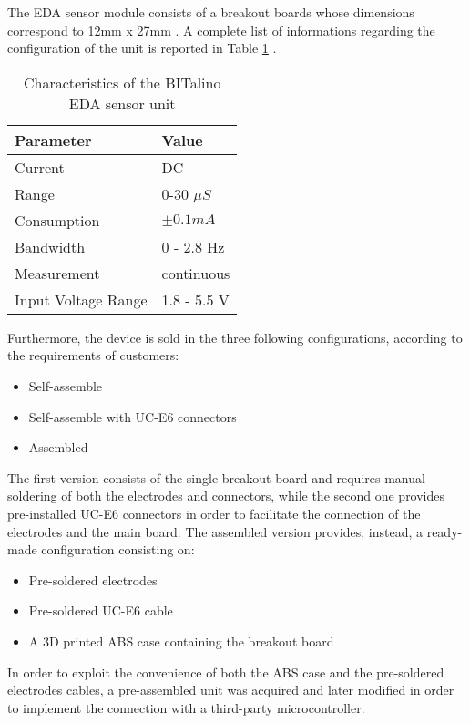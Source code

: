 The EDA sensor module consists of a breakout boards whose dimensions correspond to 12mm x 27mm \cite{bitalino-general}. A complete list of informations regarding the configuration of the unit is reported in Table \ref{toc:bitalino-features} .

\begin{table}[H]
\centering
\begin{tabular}{ll}
    \hline
    Parameter               & Value \\
    \hline
    Current                 & DC \\
    Range                   & 0-30 $\mu S$ \\
    Consumption             & $\pm 0.1 mA$ \\
    Bandwidth               & 0 - 2.8 Hz \\
    Measurement             & continuous \\
    Input Voltage Range     & 1.8 - 5.5 V \\
    \hline
\end{tabular}
\caption{Characteristics of the BITalino EDA sensor unit}
\label{toc:bitalino-features}
\end{table}

Furthermore, the device is sold in the three following configurations, according to the requirements of customers: 

\begin{itemize}
    \item Self-assemble
    \item Self-assemble with UC-E6 connectors
    \item Assembled
\end{itemize}

The first version consists of the single breakout board and requires manual soldering of both the electrodes and connectors, while the second one provides pre-installed UC-E6 connectors in order to facilitate the connection of the electrodes and the main board. The assembled version provides, instead, a ready-made configuration consisting on: 

\begin{itemize}
    \item Pre-soldered electrodes
    \item Pre-soldered UC-E6 cable
    \item A 3D printed ABS case containing the breakout board
\end{itemize}


In order to exploit the convenience of both the ABS case and the pre-soldered electrodes cables, a pre-assembled unit was acquired and later modified in order to implement the connection with a third-party microcontroller. 







